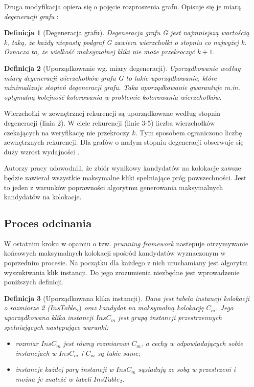 \documentclass[12pt]{article}
\newtheorem{defin}{Definicja}
\begin{document}
Druga modyfikacja opiera się o pojęcie rozproszenia grafu. Opisuje się je miarą \textit{degeneracji grafu} \cite{matusiak}:
\begin{defin}[Degeneracja grafu]
Degeneracja grafu G jest najmniejszą wartością k, taką, że każdy niepusty podgraf G zawiera wierzchołki o stopniu co najwyżej k. Oznacza to, że wielkość maksymalnej kliki nie może przekroczyć $k + 1$.
\label{def:degeneracy}
\end{defin}

\begin{defin}[Uporządkowanie wg. miary degeneracji]
Uporządkowanie według miary degeneracji wierzchołków grafu G to takie uporządkowanie, które minimalizuje stopień degeneracji grafu. Taka uporządkowanie gwarantuje m.in. optymalną kolejność kolorowania w problemie kolorowania wierzchołków.
\end{defin}

Wierzchołki w zewnętrznej rekurencji są uporządkowane według stopnia degeneracji (linia 2). W ciele rekurencji (linie 3-5) liczba wierzchołków czekających na weryfikację nie przekroczy $ k $. Tym sposobem ograniczono liczbę zewnętrznych rekurencji. Dla grafów o małym stopniu degeneracji obserwuje się duży wzrost wydajności \cite{degenerat}.

Autorzy pracy \cite{wang} udowodnili, że zbiór wynikowy kandydatów na kolokacje zawsze będzie zawierał wszystkie maksymalne kliki spełniające próg powszechności. Jest to jeden z warunków poprawności algorytmu generowania maksymalnych kandydatów na kolokacje.

\subsection{Proces odcinania}

W ostatnim kroku w oparciu o tzw. \textit{prunning framework} \cite{wang} nastepuje otrzymywanie końcowych maksymalnych kolokacji spośród kandydatów wyznaczonym w poprzednim procesie. Na początku dla każdego z nich uruchamiany jest algorytm wyszukiwania klik instancji. Do jego zrozumienia niezbędne jest wprowadzenie poniższych definicji.

\begin{defin}[Uporządkowana klika instancji]
Dana jest tabela instancji kolokacji o rozmiarze 2 ($ InsTable_{2}) $ oraz kandydat na maksymalną kolokację $ C_{m} $. Jego uporządkowana klika instancji $ InsC_{m} $ jest grupą instancji przestrzennych spełniających następujące warunki:
\begin{itemize}
\item rozmiar $ InsC_{m} $ jest równy rozmiarowi $ C_{m} $, a cechy w odpowiadających sobie instancjach w $ InsC_{m} $ i $ C_{m} $ są takie same; %
\item instancje każdej pary instancji w $ InsC_{m} $ sąsiadują ze sobą w przestrzeni i można je znaleźć w tabeli  $ InsTable_{2} $.
\end{itemize}
\end{defin}
\end{document}
